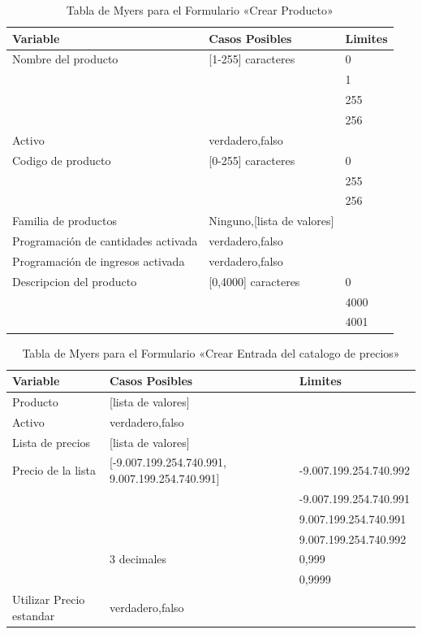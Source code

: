 \begin{table}
\centering
\begin{tabular}{|l|l|l|}
\hline
\textbf{Variable} & \textbf{Casos Posibles} & \textbf{Limites} \\
\hline
Nombre del producto & [1-255] caracteres & 0 \\
& & 1 \\
& & 255 \\
& & 256 \\
\hline
Activo  & {verdadero,falso} & \\
\hline
Codigo de producto & [0-255] caracteres & 0 \\
& & 255 \\
& & 256 \\
\hline
Familia de productos & Ninguno,[lista de valores] & \\
\hline
Programación de cantidades activada & {verdadero,falso} & \\
\hline
Programación de ingresos activada & {verdadero,falso} & \\
\hline
Descripcion del producto & [0,4000] caracteres & 0 \\
& & 4000 \\
& & 4001 \\
\hline
\end{tabular}
\caption{Tabla de Myers para el Formulario «Crear Producto»}
\label{myers_01}
\end{table}

\begin{table}
\centering
\begin{tabular}{|l|p{5.0cm}|l|}
\hline
\textbf{Variable} & \textbf{Casos Posibles} & \textbf{Limites} \\
\hline
Producto & [lista de valores] & \\
\hline
Activo  & {verdadero,falso} & \\
\hline
Lista de precios & [lista de valores] & \\
\hline
Precio de la lista & [-9.007.199.254.740.991, 9.007.199.254.740.991] & -9.007.199.254.740.992 \\
& & -9.007.199.254.740.991 \\
& & 9.007.199.254.740.991 \\
& & 9.007.199.254.740.992 \\
& 3 decimales & 0,999 \\
& & 0,9999 \\
\hline
Utilizar Precio estandar & {verdadero,falso} & \\
\hline
\end{tabular}
\caption{Tabla de Myers para el Formulario «Crear Entrada del catalogo de precios»}
\label{myers_02}
\end{table}

